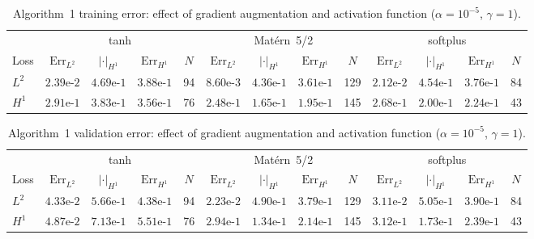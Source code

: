 \documentclass[12pt,fleqn]{amsart}
\theoremstyle{definition}
\begin{document}
\begin{table}[H]
\centering
\caption{Algorithm~1 training error: effect of gradient augmentation and activation function ($\alpha = 10^{-5}$, $\gamma = 1$).}
\label{tab:alg1_gradient_train}
\begin{tabular}{l|cccc|cccc|cccc}
\hline
 & \multicolumn{4}{c|}{tanh} & \multicolumn{4}{c|}{Mat\'ern~5/2} & \multicolumn{4}{c}{softplus} \\
Loss & $\mathrm{Err}_{L^2}$ & $|\cdot|_{H^1}$ & $\mathrm{Err}_{H^1}$ & $N$ & $\mathrm{Err}_{L^2}$ & $|\cdot|_{H^1}$ & $\mathrm{Err}_{H^1}$ & $N$ & $\mathrm{Err}_{L^2}$ & $|\cdot|_{H^1}$ & $\mathrm{Err}_{H^1}$ & $N$ \\
\hline
$L^2$ & $2.39\text{e-}2$ & $4.69\text{e-}1$ & $3.88\text{e-}1$ & 94 & $8.60\text{e-}3$ & $4.36\text{e-}1$ & $3.61\text{e-}1$ & 129 & $2.12\text{e-}2$ & $4.54\text{e-}1$ & $3.76\text{e-}1$ & 84 \\
$H^1$ & $2.91\text{e-}1$ & $3.83\text{e-}1$ & $3.56\text{e-}1$ & 76 & $2.48\text{e-}1$ & $1.65\text{e-}1$ & $1.95\text{e-}1$ & 145 & $2.68\text{e-}1$ & $2.00\text{e-}1$ & $2.24\text{e-}1$ & 43 \\
\hline
\end{tabular}
\end{table}

\begin{table}[H]
\centering
\caption{Algorithm~1 validation error: effect of gradient augmentation and activation function ($\alpha = 10^{-5}$, $\gamma = 1$).}
\label{tab:alg1_gradient_val}
\begin{tabular}{l|cccc|cccc|cccc}
\hline
 & \multicolumn{4}{c|}{tanh} & \multicolumn{4}{c|}{Mat\'ern~5/2} & \multicolumn{4}{c}{softplus} \\
Loss & $\mathrm{Err}_{L^2}$ & $|\cdot|_{H^1}$ & $\mathrm{Err}_{H^1}$ & $N$ & $\mathrm{Err}_{L^2}$ & $|\cdot|_{H^1}$ & $\mathrm{Err}_{H^1}$ & $N$ & $\mathrm{Err}_{L^2}$ & $|\cdot|_{H^1}$ & $\mathrm{Err}_{H^1}$ & $N$ \\
\hline
$L^2$ & $4.33\text{e-}2$ & $5.66\text{e-}1$ & $4.38\text{e-}1$ & 94 & $2.23\text{e-}2$ & $4.90\text{e-}1$ & $3.79\text{e-}1$ & 129 & $3.11\text{e-}2$ & $5.05\text{e-}1$ & $3.90\text{e-}1$ & 84 \\
$H^1$ & $4.87\text{e-}2$ & $7.13\text{e-}1$ & $5.51\text{e-}1$ & 76 & $2.94\text{e-}1$ & $1.34\text{e-}1$ & $2.14\text{e-}1$ & 145 & $3.12\text{e-}1$ & $1.73\text{e-}1$ & $2.39\text{e-}1$ & 43 \\
\hline
\end{tabular}
\end{table}
\end{document}
